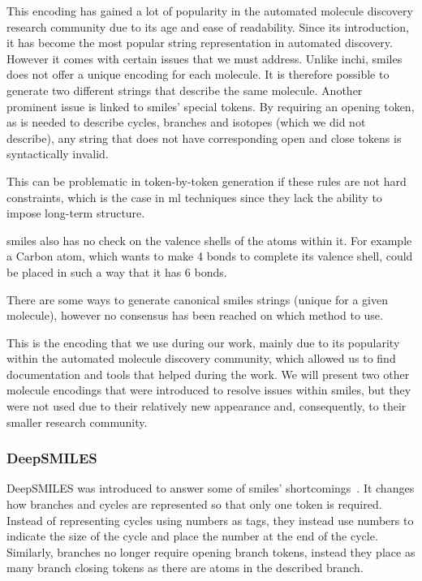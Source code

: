 \documentclass[../Document.tex]{subfiles}
\begin{document}
This encoding has gained a lot of popularity in the automated molecule discovery research community due to its age and ease of readability. Since its introduction, it has become the most popular string representation in automated discovery.
However it comes with certain issues that we must address. Unlike \gls{inchi}, \gls{smiles} does not offer a unique encoding for each molecule. It is therefore possible to generate two different strings that describe the same molecule.
Another prominent issue is linked to \gls{smiles}' special tokens. By requiring an opening token, as is needed to describe cycles, branches and isotopes (which we did not describe), any string that does not have corresponding open and close tokens is syntactically invalid. 

This can be problematic in token-by-token generation if these rules are not hard constraints, which is the case in \gls{ml} techniques since they lack the ability to impose long-term structure.

\gls{smiles} also has no check on the valence shells of the atoms within it. 
For example a Carbon atom, which wants to make 4 bonds to complete its valence shell, could be placed in such a way that it has 6 bonds.

There are some ways to generate canonical \gls{smiles} strings (\ie unique for a given molecule), however no consensus has been reached on which method to use.

This is the encoding that we use during our work, mainly due to its popularity within the automated molecule discovery community, which allowed us to find documentation and tools that helped during the work. We will present two other molecule encodings that were introduced to resolve issues within \gls{smiles}, but they were not used due to their relatively new appearance and, consequently, to their smaller research community.


\subsubsection{DeepSMILES}
DeepSMILES was introduced to answer some of \gls{smiles}' shortcomings~\cite{deepsmiles_intro}. It changes how branches and cycles are represented so that only one token is required. Instead of representing cycles using numbers as tags, they instead use numbers to indicate the size of the cycle and place the number at the end of the cycle. Similarly, branches no longer require opening branch tokens, instead they place as many branch closing tokens as there are atoms in the described branch.
\end{document}
